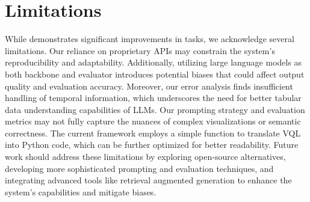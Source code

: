 
\section*{Limitations}
\label{limitations}
While \system demonstrates significant improvements in \nlvis tasks, we acknowledge several limitations. Our reliance on proprietary APIs may constrain the system's reproducibility and adaptability. Additionally, utilizing large language models as both backbone and evaluator introduces potential biases that could affect output quality and evaluation accuracy. 
Moreover, our error analysis finds insufficient handling of temporal information, which underscores the need for better tabular data understanding capabilities of LLMs. 
Our prompting strategy and evaluation metrics may not fully capture the nuances of complex visualizations or semantic correctness. 
The current framework employs a simple function to translate VQL into Python code, which can be further optimized for better readability.
Future work should address these limitations by exploring open-source alternatives, developing more sophisticated prompting and evaluation techniques, and integrating advanced tools like retrieval augmented generation to enhance the system's capabilities and mitigate biases.


